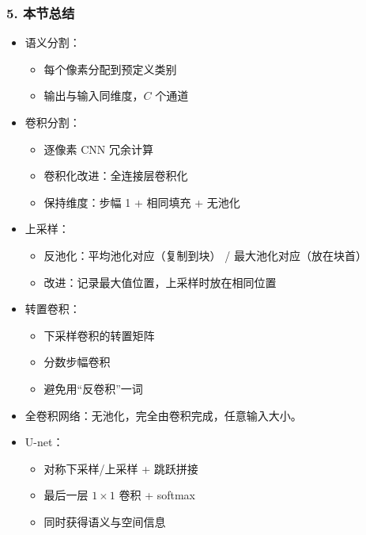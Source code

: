 \documentclass[t,aspectratio=169]{beamer} %
\begin{document}
\begin{frame}[allowframebreaks]
    \frametitle{5. 本节总结}
    \begin{itemize}
        \item \alert{语义分割}：
        \begin{itemize}
            \item 每个像素分配到预定义类别
            \item 输出与输入同维度，$C$ 个通道
        \end{itemize}
        \item \alert{卷积分割}：
        \begin{itemize}
            \item 逐像素 CNN 冗余计算
            \item 卷积化改进：全连接层卷积化
            \item 保持维度：步幅 1 + 相同填充 + 无池化
        \end{itemize}
        \item \alert{上采样}：
        \begin{itemize}
            \item 反池化：平均池化对应（复制到块） / 最大池化对应（放在块首）
            \item 改进：记录最大值位置，上采样时放在相同位置
        \end{itemize}
        \item \alert{转置卷积}：
        \begin{itemize}
            \item 下采样卷积的转置矩阵
            \item 分数步幅卷积
            \item 避免用“反卷积”一词
        \end{itemize}
        \item \alert{全卷积网络}：无池化，完全由卷积完成，任意输入大小。
        \item \alert{U-net}：
        \begin{itemize}
            \item 对称下采样/上采样 + 跳跃拼接
            \item 最后一层 $1 \times 1$ 卷积 + softmax
            \item 同时获得语义与空间信息
        \end{itemize}
    \end{itemize}
\end{frame}

\end{document}

